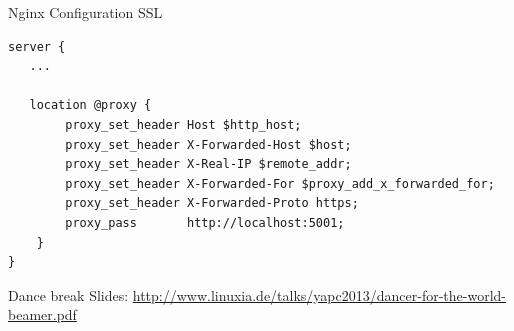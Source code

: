 \begin{frame}[fragile]{Nginx Configuration SSL}
\begin{lstlisting}
server {
   ...

   location @proxy {
        proxy_set_header Host $http_host;
        proxy_set_header X-Forwarded-Host $host;
        proxy_set_header X-Real-IP $remote_addr;
        proxy_set_header X-Forwarded-For $proxy_add_x_forwarded_for;
        proxy_set_header X-Forwarded-Proto https;
        proxy_pass       http://localhost:5001;
    }
}
\end{lstlisting}
\end{frame}

\begin{frame}{Dance break}
Slides:
\url{http://www.linuxia.de/talks/yapc2013/dancer-for-the-world-beamer.pdf}
\end{frame}



